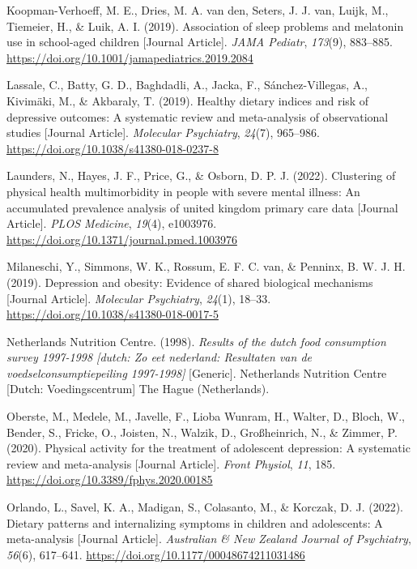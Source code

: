\documentclass[
  letterpaper,
  DIV=11,
  numbers=noendperiod]{scrreport}
\newlength{\cslhangindent}
\newenvironment{CSLReferences}[2] %
 {\begin{list}{}{%
  \setlength{\itemindent}{0pt}
  \setlength{\leftmargin}{0pt}
  \setlength{\parsep}{0pt}
  \ifodd #1
   \setlength{\leftmargin}{\cslhangindent}
   \setlength{\itemindent}{-1\cslhangindent}
  \fi
  \setlength{\itemsep}{#2\baselineskip}}}
 {\end{list}}
\begin{document}
\begin{CSLReferences}{1}{0}
Koopman-Verhoeff, M. E., Dries, M. A. van den, Seters, J. J. van, Luijk,
M., Tiemeier, H., \& Luik, A. I. (2019). Association of sleep problems
and melatonin use in school-aged children {[}Journal Article{]}.
\emph{JAMA Pediatr}, \emph{173}(9), 883--885.
\url{https://doi.org/10.1001/jamapediatrics.2019.2084}

Lassale, C., Batty, G. D., Baghdadli, A., Jacka, F., Sánchez-Villegas,
A., Kivimäki, M., \& Akbaraly, T. (2019). Healthy dietary indices and
risk of depressive outcomes: A systematic review and meta-analysis of
observational studies {[}Journal Article{]}. \emph{Molecular
Psychiatry}, \emph{24}(7), 965--986.
\url{https://doi.org/10.1038/s41380-018-0237-8}

Launders, N., Hayes, J. F., Price, G., \& Osborn, D. P. J. (2022).
Clustering of physical health multimorbidity in people with severe
mental illness: An accumulated prevalence analysis of united kingdom
primary care data {[}Journal Article{]}. \emph{PLOS Medicine},
\emph{19}(4), e1003976.
\url{https://doi.org/10.1371/journal.pmed.1003976}

Milaneschi, Y., Simmons, W. K., Rossum, E. F. C. van, \& Penninx, B. W.
J. H. (2019). Depression and obesity: Evidence of shared biological
mechanisms {[}Journal Article{]}. \emph{Molecular Psychiatry},
\emph{24}(1), 18--33. \url{https://doi.org/10.1038/s41380-018-0017-5}

Netherlands Nutrition Centre. (1998). \emph{Results of the dutch food
consumption survey 1997-1998 {[}dutch: Zo eet nederland: Resultaten van
de voedselconsumptiepeiling 1997-1998{]}} {[}Generic{]}. Netherlands
Nutrition Centre {[}Dutch: Voedingscentrum{]} The Hague (Netherlands).

Oberste, M., Medele, M., Javelle, F., Lioba Wunram, H., Walter, D.,
Bloch, W., Bender, S., Fricke, O., Joisten, N., Walzik, D.,
Großheinrich, N., \& Zimmer, P. (2020). Physical activity for the
treatment of adolescent depression: A systematic review and
meta-analysis {[}Journal Article{]}. \emph{Front Physiol}, \emph{11},
185. \url{https://doi.org/10.3389/fphys.2020.00185}

Orlando, L., Savel, K. A., Madigan, S., Colasanto, M., \& Korczak, D. J.
(2022). Dietary patterns and internalizing symptoms in children and
adolescents: A meta-analysis {[}Journal Article{]}. \emph{Australian \&
New Zealand Journal of Psychiatry}, \emph{56}(6), 617--641.
\url{https://doi.org/10.1177/00048674211031486}


\end{CSLReferences}
\end{document}

